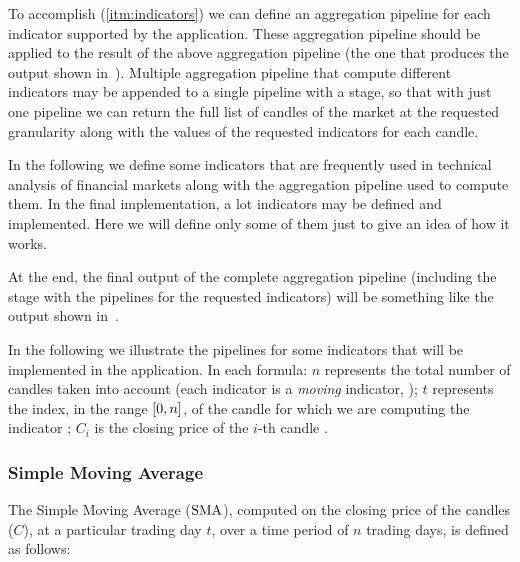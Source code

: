 To accomplish (\ref{itm:indicators}) we can define an aggregation pipeline for
each indicator supported by the application. These aggregation pipeline should
be applied to the result of the above aggregation pipeline (the one that
produces the output shown in~). Multiple
aggregation pipeline that compute different indicators may be appended to a
single pipeline with a  stage, so that with just one pipeline we
can return the full list of candles of the market at the requested granularity
along with the values of the requested indicators for each candle.

In the following we define some indicators that are frequently used in technical
analysis of financial markets along with the aggregation pipeline used to
compute them. In the final implementation, a lot indicators may be defined and
implemented. Here we will define only some of them just to give an idea of how
it works.

At the end, the final output of the complete aggregation pipeline (including the
 stage with the pipelines for the requested indicators) will be
something like the output shown in~.



In the following we illustrate the pipelines for some indicators that will be
implemented in the application. In each formula: \(n\) represents the total
number of candles taken into account (each indicator is a \emph{moving}
indicator, ); \(t\) represents the index, in the range
\(\interval{0}{n}\), of the candle for which we are computing the indicator
; \(C_i\) is the
closing price of the \(i\)-th candle .

\subsubsection{Simple Moving Average}

The Simple Moving Average (\(\operatorname{SMA}\)), computed on the closing price of the
candles (\(C\)), at a particular trading day \(t\), over a time period of \(n\)
trading days, is defined as follows:

